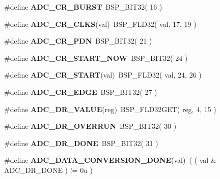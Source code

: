 \begin{DoxyCompactItemize}
\mbox{\label{adc-defs_8h_ac4274c705620f3ddd5ba7f73249e6248}} 
\#define {\bfseries A\+D\+C\+\_\+\+C\+R\+\_\+\+B\+U\+R\+ST}~B\+S\+P\+\_\+\+B\+I\+T32( 16 )
\item 
\mbox{\label{adc-defs_8h_a45bb03b11fb013ffd4479eb0dbda8117}} 
\#define {\bfseries A\+D\+C\+\_\+\+C\+R\+\_\+\+C\+L\+KS}(val)~B\+S\+P\+\_\+\+F\+L\+D32( val, 17, 19 )
\item 
\mbox{\label{adc-defs_8h_a7474e4ab5695434acbfe8a5fcad35ef0}} 
\#define {\bfseries A\+D\+C\+\_\+\+C\+R\+\_\+\+P\+DN}~B\+S\+P\+\_\+\+B\+I\+T32( 21 )
\item 
\mbox{\label{adc-defs_8h_ad9f225e8d5f50609888edab56cd0da5c}} 
\#define {\bfseries A\+D\+C\+\_\+\+C\+R\+\_\+\+S\+T\+A\+R\+T\+\_\+\+N\+OW}~B\+S\+P\+\_\+\+B\+I\+T32( 24 )
\item 
\mbox{\label{adc-defs_8h_af2e407e2b8b655960eff138bfe512d6e}} 
\#define {\bfseries A\+D\+C\+\_\+\+C\+R\+\_\+\+S\+T\+A\+RT}(val)~B\+S\+P\+\_\+\+F\+L\+D32( val, 24, 26 )
\item 
\mbox{\label{adc-defs_8h_a1d05d43234dd2d1489841dff0012225e}} 
\#define {\bfseries A\+D\+C\+\_\+\+C\+R\+\_\+\+E\+D\+GE}~B\+S\+P\+\_\+\+B\+I\+T32( 27 )
\item 
\mbox{\label{adc-defs_8h_af16b60644f26c1c5235bfa4ef61bc529}} 
\#define {\bfseries A\+D\+C\+\_\+\+D\+R\+\_\+\+V\+A\+L\+UE}(reg)~B\+S\+P\+\_\+\+F\+L\+D32\+G\+ET( reg, 4, 15 )
\item 
\mbox{\label{adc-defs_8h_a9b38483d3b4879c31408525f66fec07e}} 
\#define {\bfseries A\+D\+C\+\_\+\+D\+R\+\_\+\+O\+V\+E\+R\+R\+UN}~B\+S\+P\+\_\+\+B\+I\+T32( 30 )
\item 
\mbox{\label{adc-defs_8h_a4d9cd1222f02b3e5542dd73fc46c52c3}} 
\#define {\bfseries A\+D\+C\+\_\+\+D\+R\+\_\+\+D\+O\+NE}~B\+S\+P\+\_\+\+B\+I\+T32( 31 )
\item 
\mbox{\label{adc-defs_8h_ad34dd14c36de3e3c0b742c4bf0c7b76a}} 
\#define {\bfseries A\+D\+C\+\_\+\+D\+A\+T\+A\+\_\+\+C\+O\+N\+V\+E\+R\+S\+I\+O\+N\+\_\+\+D\+O\+NE}(val)~( ( val \& A\+D\+C\+\_\+\+D\+R\+\_\+\+D\+O\+NE ) != 0u )
\end{DoxyCompactItemize}
